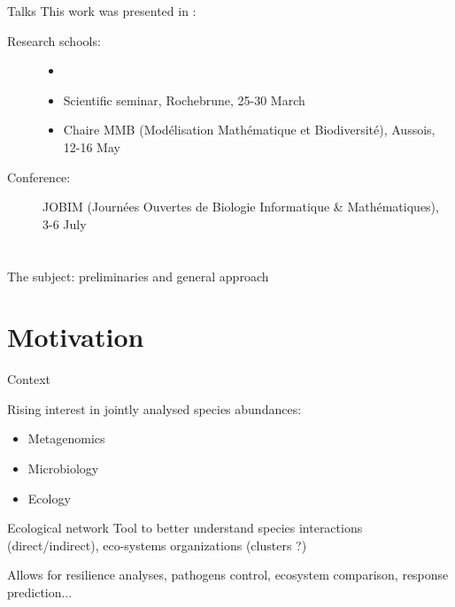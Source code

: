 \documentclass[9pt]{beamer}
\newcommand{\emphase}[1]{\textcolor{Complement}{#1}}
\newcommand{\bleu}[1]{\textcolor{Framableulight}{#1}}
\begin{document}
\begin{frame}{Talks}
    This work was presented in : \vspace{0.5cm}
\begin{description}
    \item[Research schools:] \begin{itemize}
        \item []
        \item Scientific seminar, Rochebrune, 25-30 March
        \item Chaire MMB (Modélisation Mathématique et Biodiversité), Aussois, 12-16 May\bigskip
    \end{itemize}
    \item[Conference:] JOBIM (Journées Ouvertes de Biologie Informatique \& Mathématiques), 3-6 July
\end{description}
\end{frame}

\section{}
\subsection{}
\begin{frame}{}
\begin{center}
\huge{\bleu{The subject: preliminaries and general approach}}
\end{center}
\end{frame}
\section{Motivation}


\begin{frame}{Context}

Rising interest in \emphase{jointly analysed }species abundances:
\begin{itemize}
	\item Metagenomics 
	\item Microbiology
	\item Ecology
\end{itemize}

\begin{block}{Ecological network}
Tool to better understand species interactions (direct/indirect), eco-systems organizations (clusters ?) 
\end{block}\bigskip
Allows for resilience analyses, pathogens control, ecosystem comparison, response prediction...
\end{frame}
\end{document}
